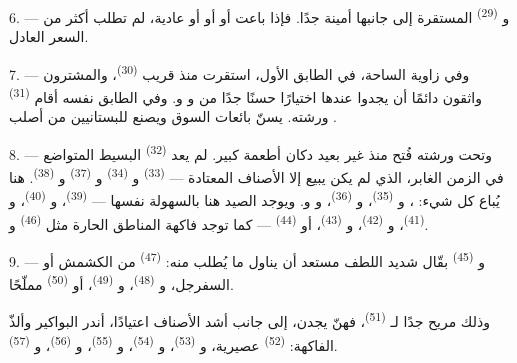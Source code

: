 \VUsaut{4.0mm}
\VUsaut{3.0mm}

6. --- و \textsuperscript{(29)} المستقرة إلى جانبها أمينة
جدًا. فإذا باعت  أو  أو  أو
 عادية، لم تطلب أكثر من السعر العادل.

7. --- وفي زاوية الساحة، في الطابق الأول، استقرت منذ قريب  \textsuperscript{(30)}، والمشترون واثقون دائمًا أن يجدوا عندها اختيارًا
حسنًا جدًا من  و و. وفي الطابق نفسه أقام  \textsuperscript{(31)} ورشته.
يسنّ  بائعات السوق ويصنع للبستانيين  من
أصلب .

\VUsaut{4.0mm}
\VUsaut{3.0mm}

8. --- وتحت ورشته فُتح منذ غير بعيد دكان أطعمة كبير. لم يعد
 \textsuperscript{(32)} البسيط المتواضع في الزمن الغابر،
الذي لم يكن يبيع إلا الأصناف المعتادة ---  \textsuperscript{(33)}
و \textsuperscript{(34)} و \textsuperscript{(37)}
و \textsuperscript{(38)}. هنا يُباع كل شيء:
، و \textsuperscript{(35)}،
و \textsuperscript{(36)}، و
و. ويوجد الصيد هنا بالسهولة نفسها --- 
\textsuperscript{(39)}، و \textsuperscript{(40)}، و
\textsuperscript{(41)}، و \textsuperscript{(42)}، و
\textsuperscript{(43)}، أو  \textsuperscript{(44)} --- كما توجد فاكهة
المناطق الحارة مثل  \textsuperscript{(46)} و.

9. --- و \textsuperscript{(45)} بقّال شديد اللطف مستعد أن يناول ما
يُطلب منه:  \textsuperscript{(47)} من الكشمش أو السفرجل،
و \textsuperscript{(48)}، و \textsuperscript{(49)}، أو
 \textsuperscript{(50)} مملّحًا.

وذلك مريح جدًا لـ \textsuperscript{(51)}، فهنّ يجدن، إلى جانب
أشد الأصناف اعتيادًا، أندر البواكير وألذّ الفاكهة: 
\textsuperscript{(52)} عصيرية، و \textsuperscript{(53)}،
و \textsuperscript{(54)}، و \textsuperscript{(55)}،
و \textsuperscript{(56)}، و \textsuperscript{(57)}.

